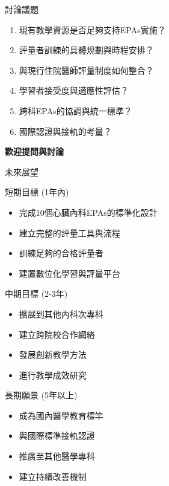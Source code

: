 \documentclass[aspectratio=169]{beamer}
\begin{document}
\begin{frame}{討論議題}
\begin{enumerate}
\item 現有教學資源是否足夠支持EPAs實施？
\item 評量者訓練的具體規劃與時程安排？
\item 與現行住院醫師評量制度如何整合？
\item 學習者接受度與適應性評估？
\item 跨科EPAs的協調與統一標準？
\item 國際認證與接軌的考量？
\end{enumerate}

\vspace{1cm}
\begin{center}
\Large{\textcolor{emergency_blue}{\textbf{歡迎提問與討論}}}
\end{center}
\end{frame}

\begin{frame}{未來展望}
\begin{alertblock}{短期目標 (1年內)}
\begin{itemize}
\item 完成10個心臟內科EPAs的標準化設計
\item 建立完整的評量工具與流程
\item 訓練足夠的合格評量者
\item 建置數位化學習與評量平台
\end{itemize}
\end{alertblock}

\begin{block}{中期目標 (2-3年)}
\begin{itemize}
\item 擴展到其他內科次專科
\item 建立跨院校合作網絡
\item 發展創新教學方法
\item 進行教學成效研究
\end{itemize}
\end{block}

\begin{exampleblock}{長期願景 (5年以上)}
\begin{itemize}
\item 成為國內醫學教育標竿
\item 與國際標準接軌認證
\item 推廣至其他醫學專科
\item 建立持續改善機制
\end{itemize}
\end{exampleblock}
\end{frame}
\end{document}
